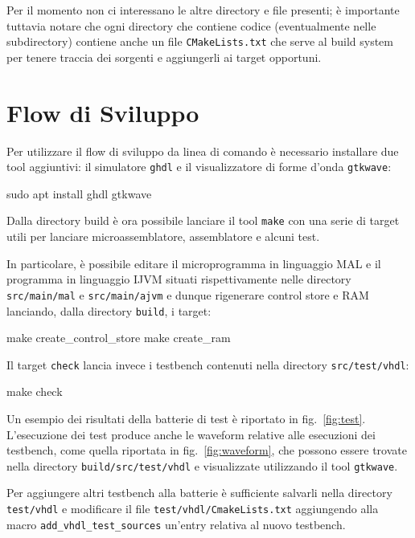 \documentclass[a4paper,12pt]{scrreprt}
\begin{document}
Per il momento non ci interessano le altre directory e file presenti; è
importante tuttavia notare che ogni directory che contiene codice (eventualmente
nelle subdirectory) contiene anche un file \lstinline{CMakeLists.txt} che serve
al build system per tenere traccia dei sorgenti e aggiungerli ai target
opportuni.

\section{Flow di Sviluppo}

Per utilizzare il flow di sviluppo da linea di comando è necessario installare
due tool aggiuntivi: il simulatore \lstinline{ghdl} e il visualizzatore di forme
d'onda \lstinline{gtkwave}:

\begin{commandshell}
  sudo apt install ghdl gtkwave
\end{commandshell}

Dalla directory build è ora possibile lanciare il tool \lstinline{make} con una
serie di target utili per lanciare microassemblatore, assemblatore e alcuni
test.

In particolare, è possibile editare il microprogramma in linguaggio MAL e il
programma in linguaggio IJVM situati rispettivamente nelle directory
\lstinline{src/main/mal} e \lstinline{src/main/ajvm} e dunque rigenerare control
store e RAM lanciando, dalla directory \lstinline{build}, i target:

\begin{commandshell}
  make create_control_store
  make create_ram
\end{commandshell}

Il target \lstinline{check} lancia invece i testbench contenuti nella directory
\lstinline{src/test/vhdl}:
\begin{commandshell}
  make check
\end{commandshell}

Un esempio dei risultati della batterie di test è riportato in
fig.~\ref{fig:test}. L'esecuzione dei test produce anche le waveform relative
alle esecuzioni dei testbench, come quella riportata in fig.~\ref{fig:waveform},
che possono essere trovate nella directory \lstinline{build/src/test/vhdl} e
visualizzate utilizzando il tool \lstinline{gtkwave}.

Per aggiungere altri testbench alla batterie è sufficiente salvarli nella
directory \lstinline{test/vhdl} e modificare il file
\lstinline{test/vhdl/CmakeLists.txt} aggiungendo alla macro
\lstinline{add_vhdl_test_sources} un'entry relativa al nuovo testbench.
\end{document}
